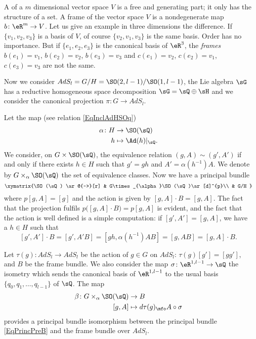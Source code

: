 A  of a $m$ dimensional vector space $V$ is a free and generating part; it only has the structure of a set. A frame of the vector space $V$ is a nondegenerate map $b\colon \eR^{m}\to V$. Let us give an example in three dimensions the difference. If $\{ v_{1},v_{2},v_{3} \}$ is a basis of $V$, of course $\{ v_{2},v_{1},v_{3} \}$ is the same basis. Order has no importance. But if $\{ e_{1},e_{2},e_{3} \}$ is the canonical basis of $\eR^{3}$, the \emph{frames} $b(e_{1})=v_1$, $b(e_{2})=v_2$, $b(e_{3})=v_{3}$ and $c(e_{1})=v_2$, $c(e_{2})=v_1$, $c(e_{3})=v_{3}$ are not the same.

Now we consider $AdS_l=G/H=\SO(2,l-1)/\SO(1,l-1)$, the Lie algebra $\sG$ has a reductive homogeneous space decomposition $\sG=\sQ\oplus\sH$ and we consider the canonical projection $\pi\colon G\to AdS_l$.

Let the map (see relation \eqref{EqInclAdHSOq})
\begin{equation}
\begin{aligned}
 \alpha\colon H&\to \SO(\sQ) \\ 
h&\mapsto \Ad(h)|_{\sQ}.
\end{aligned}
\end{equation}
We consider, on $G\times\SO(\sQ)$, the equivalence relation $(g,A)\sim(g',A')$ if and only if there exists $h\in H$ such that $g'=gh$ and $A'=\alpha(h^{-1})A$. We denote by $G\times_{\alpha}\SO(\sQ)$ the set of equivalence classes. Now we have a principal bundle
\begin{equation}   \label{EqPrincPreB}
\xymatrix{%
   \SO(\sQ) \ar@{~>}[r]     &   G\times_{\alpha}\SO(\sQ)\ar[d]^{p}\\
                &      G/H
}
\end{equation}
where $p[g,A]=[g]$ and the action is given by $[g,A]\cdot B=[g,A]$. The fact that the projection fulfils $p\big( [g,A]\cdot B \big)=p[g,A]$ is evident, and the fact that the action is well defined is a simple computation:
if $[g',A']=[g,A]$, we have a $h\in H$ such that
\[ 
  [g',A']\cdot B=[g',A'B]
        =[gh,\alpha(h^{-1})AB]
        =[g,AB]
        =[g,A]\cdot B.
\]

\begin{proposition}
Let $\tau(g)\colon AdS_l\to AdS_l$ be the action of $g\in G$ on $AdS_l$: $\tau(g)[g']=[gg']$, and $B$ be the frame bundle. We also consider the map $\sigma\colon \eR^{1,l-1}\to \sQ$ the isometry which sends the canonical basis of $\eR^{1,l-1}$ to the usual basis $\{ q_0,q_{1},\ldots,q_{l-1} \}$ of $\sQ$. The map
\begin{equation}
\begin{aligned}
 \beta\colon G\times_{\alpha} \SO(\sQ)&\to B \\ 
[g,A]&\mapsto d\tau(g)_{\mfo}A\circ\sigma 
\end{aligned}
\end{equation}
provides a principal bundle isomorphism between the principal bundle  \eqref{EqPrincPreB} and the frame bundle over $AdS_l$. 

\end{proposition}

